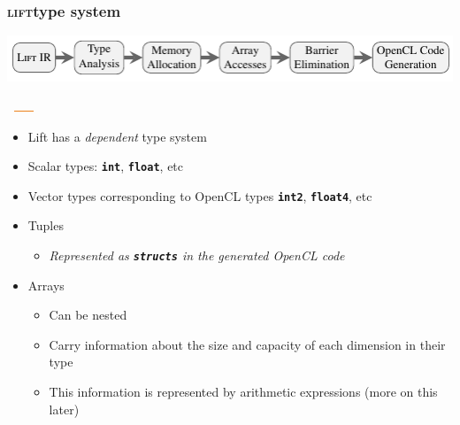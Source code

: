 \documentclass[10pt,usetotalslideindicator]{beamer}
\newcommand{\lift}{\textsc{lift}\space}
\newcommand{\code}[1]{\textbf{\texttt{#1}}}
\begin{document}
\begin{frame}[t]
\frametitle{\lift type system}
    \vspace{-1cm}
    \begin{block}{}
        \begin{center}
            \includegraphics[width=1\textwidth]{../images/compilation_stages.pdf}
        \end{center}
        \vspace{-1.05cm}
        \hspace{1.63cm}
        \includegraphics[width=1cm, height=0.03cm]{../images/orange_bar.png}
        \vspace{.45cm}
    \end{block}
    \vspace{-0.5cm}
\begin{itemize}
	\item Lift has a \textit{dependent} type system
	\item Scalar types: \code{int}, \code{float}, etc
	\item Vector types corresponding to OpenCL types \code{int2}, \code{float4}, etc
	\item Tuples
	\begin{itemize}
		\item \textit{Represented as \code{structs} in the generated OpenCL code}
	\end{itemize}
	\item Arrays
	\begin{itemize}
		\item Can be nested
		\item Carry information about the size and capacity of each dimension in their type
		\item This information is represented by arithmetic expressions (more on this later)
	\end{itemize}
\end{itemize}
\end{frame}
\end{document}
